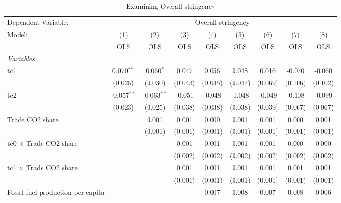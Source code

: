 
\begin{table}[htbp]
   \caption{Examining Overall stringency}
   \centering
   \begin{tabular}{lcccccccc}
      \toprule
      Dependent Variable: & \multicolumn{8}{c}{Overall stringency}\\
      Model:                                  & (1)           & (2)           & (3)     & (4)     & (5)     & (6)     & (7)     & (8)\\  
                                              &  OLS          & OLS           & OLS     & OLS     & OLS     & OLS     & OLS     & OLS\\  
      \midrule
      \emph{Variables}\\
      tc1                                     & 0.070$^{**}$  & 0.060$^{*}$   & 0.047   & 0.056   & 0.048   & 0.016   & -0.070  & -0.060\\   
                                              & (0.026)       & (0.030)       & (0.043) & (0.045) & (0.047) & (0.069) & (0.106) & (0.102)\\   
      tc2                                     & -0.057$^{**}$ & -0.063$^{**}$ & -0.051  & -0.048  & -0.048  & -0.049  & -0.108  & -0.099\\   
                                              & (0.023)       & (0.025)       & (0.038) & (0.038) & (0.038) & (0.039) & (0.067) & (0.067)\\   
      Trade CO2 share                         &               & 0.001         & 0.001   & 0.000   & 0.001   & 0.001   & 0.000   & 0.001\\   
                                              &               & (0.001)       & (0.001) & (0.001) & (0.001) & (0.001) & (0.001) & (0.001)\\   
      tc0 $\times$ Trade CO2 share            &               &               & 0.001   & 0.001   & 0.001   & 0.001   & 0.000   & 0.000\\   
                                              &               &               & (0.002) & (0.002) & (0.002) & (0.002) & (0.002) & (0.002)\\   
      tc1 $\times$ Trade CO2 share            &               &               & 0.001   & 0.001   & 0.001   & 0.001   & 0.001   & 0.001\\   
                                              &               &               & (0.001) & (0.001) & (0.001) & (0.001) & (0.001) & (0.001)\\   
      Fossil fuel production per capita       &               &               &         & 0.007   & 0.008   & 0.007   & 0.008   & 0.006\\   

\end{tabular}
\end{table}
